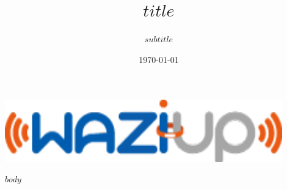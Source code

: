 \documentclass[12pt]{article}
\title{$title$}
\subtitle{$subtitle$}
\begin{document}
\begin{titlepage}
\begin{center}

\includegraphics[width=12cm]{static/images/logo-waziup.png}

\vspace{7cm}
 
\vspace{2cm}
\date{\today}

\end{center}
\end{titlepage}

\setcounter{tocdepth}{$toc-depth$}
\tableofcontents
\newpage

$body$
\end{document}
